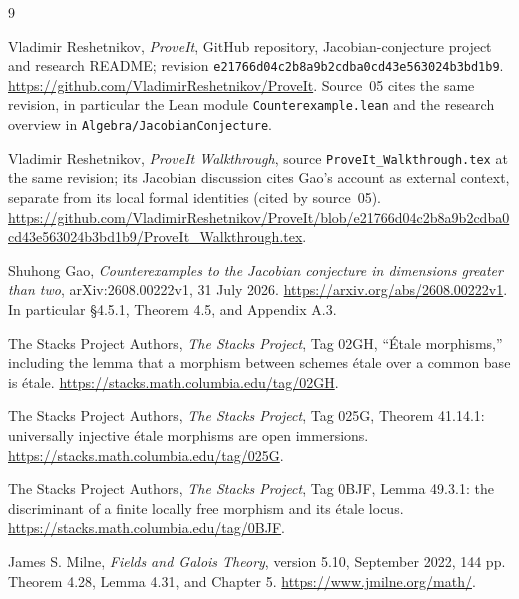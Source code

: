 \documentclass[11pt,a4paper]{article}
\theoremstyle{definition}
\newcommand{\code}[1]{\texttt{\nolinkurl{#1}}}
\begin{document}
\begin{thebibliography}{9}
Vladimir Reshetnikov, \emph{ProveIt}, GitHub repository, Jacobian-conjecture
project and research README; revision
\code{e21766d04c2b8a9b2cdba0cd43e563024b3bd1b9}.
\url{https://github.com/VladimirReshetnikov/ProveIt}.
Source~05 cites the same revision, in particular the Lean module
\code{Counterexample.lean} and the research overview in
\code{Algebra/JacobianConjecture}.

Vladimir Reshetnikov, \emph{ProveIt Walkthrough}, source
\code{ProveIt_Walkthrough.tex} at the same revision; its Jacobian discussion
cites Gao's account as external context, separate from its local formal
identities (cited by source~05).
\url{https://github.com/VladimirReshetnikov/ProveIt/blob/e21766d04c2b8a9b2cdba0cd43e563024b3bd1b9/ProveIt_Walkthrough.tex}.

Shuhong Gao, \emph{Counterexamples to the Jacobian conjecture in dimensions
greater than two}, arXiv:2608.00222v1, 31 July 2026.
\url{https://arxiv.org/abs/2608.00222v1}.
In particular \S4.5.1, Theorem 4.5, and Appendix A.3.

The Stacks Project Authors, \emph{The Stacks Project}, Tag 02GH,
``\'Etale morphisms,'' including the lemma that a morphism between
schemes \'etale over a common base is \'etale.
\url{https://stacks.math.columbia.edu/tag/02GH}.

The Stacks Project Authors, \emph{The Stacks Project}, Tag 025G,
Theorem 41.14.1: universally injective \'etale morphisms are open immersions.
\url{https://stacks.math.columbia.edu/tag/025G}.

The Stacks Project Authors, \emph{The Stacks Project}, Tag 0BJF,
Lemma 49.3.1: the discriminant of a finite locally free morphism and
its \'etale locus.
\url{https://stacks.math.columbia.edu/tag/0BJF}.

James S. Milne, \emph{Fields and Galois Theory}, version 5.10,
September 2022, 144 pp. Theorem 4.28, Lemma 4.31, and Chapter 5.
\url{https://www.jmilne.org/math/}.
\end{thebibliography}
\end{document}

